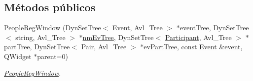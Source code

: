 \subsection*{Métodos públicos}
\begin{DoxyCompactItemize}
\item 
\hyperlink{class_people_reg_window_aaba6efc7a020584931a9f4f92d64c0ba}{People\+Reg\+Window} (Dyn\+Set\+Tree$<$ \hyperlink{class_event}{Event}, Avl\+\_\+\+Tree $>$ $\ast$\hyperlink{class_people_reg_window_afaed29390f627773d8bfe05b7b5ff92d}{event\+Tree}, Dyn\+Set\+Tree$<$ string, Avl\+\_\+\+Tree $>$ $\ast$\hyperlink{class_people_reg_window_a72bc02cd2e5b5f7b669178e79e016c48}{nm\+Ev\+Tree}, Dyn\+Set\+Tree$<$ \hyperlink{class_participant}{Participant}, Avl\+\_\+\+Tree $>$ $\ast$\hyperlink{class_people_reg_window_aea124c8bd37c53c79f8adc1a0904f930}{part\+Tree}, Dyn\+Set\+Tree$<$ Pair, Avl\+\_\+\+Tree $>$ $\ast$\hyperlink{class_people_reg_window_ac07cbd1c74b56048d0e57253e2dd7680}{ev\+Part\+Tree}, const \hyperlink{class_event}{Event} \&\hyperlink{class_people_reg_window_ac0034c7bafd1c6cfc002006c29f23e46}{event}, Q\+Widget $\ast$parent=0)
\begin{DoxyCompactList}\small\item\em \hyperlink{class_people_reg_window}{People\+Reg\+Window}. \end{DoxyCompactList}\end{DoxyCompactItemize}
